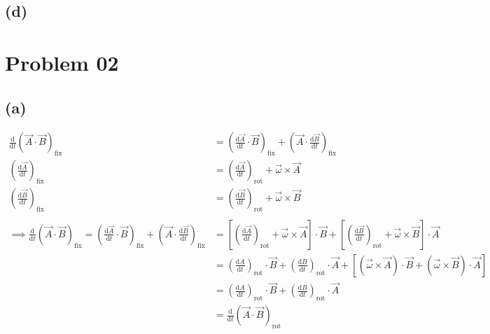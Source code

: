 \documentclass[letter, 10pts]{article}
\begin{document}
\subsection*{(d)} 


















\section*{Problem 02}
\subsection*{(a)}
\begin{align*}
\frac{\mathrm{d} }{\mathrm{d} t} \left(\vec{A} \cdot  \vec{B}\right)_\text{fix} &= 
\left(
\frac{\mathrm{d} \vec{A}}{\mathrm{d} t} \cdot \vec{B}
\right)_\text{fix} + 
\left(
\vec{A} \cdot  \frac{\mathrm{d} \vec{B}}{\mathrm{d} t}
\right)_\text{fix}
\\
\left(
\frac{\mathrm{d} \vec{A}}{\mathrm{d} t} \right)_\text{fix} 
&= 
\left(\frac{\mathrm{d} \vec{A}}{\mathrm{d} t}\right)_\text{rot}+ \vec{\omega} \times \vec{A} \\
\left(
\frac{\mathrm{d} \vec{B}}{\mathrm{d} t} \right)_\text{fix} 
&= 
\left(\frac{\mathrm{d} \vec{B}}{\mathrm{d} t}\right)_\text{rot}+ \vec{\omega} \times \vec{B} \\ 
\\\implies
\frac{\mathrm{d} }{\mathrm{d} t} \left(\vec{A} \cdot  \vec{B}\right)_\text{fix} = 
\left(
\frac{\mathrm{d} \vec{A}}{\mathrm{d} t} \cdot \vec{B}
\right)_\text{fix} + 
\left(
\vec{A} \cdot  \frac{\mathrm{d} \vec{B}}{\mathrm{d} t}
\right)_\text{fix} 
&= \left[
\left(\frac{\mathrm{d} \vec{A}}{\mathrm{d} t}\right)_\text{rot}+ \vec{\omega} \times \vec{A}
\right]\cdot \vec{B}
+\left[
\left(\frac{\mathrm{d} \vec{B}}{\mathrm{d} t}\right)_\text{rot}+ \vec{\omega} \times \vec{B}
\right]\cdot \vec{A}\\
&= 
\left(\frac{\mathrm{d} A}{\mathrm{d} t}\right)_\text{rot} \cdot \vec{B} + 
\left(\frac{\mathrm{d} B}{\mathrm{d} t}\right)_\text{rot} \cdot \vec{A} + 
\left[
	(\vec{\omega} \times \vec{A}) \cdot \vec{B} + (\vec{\omega} \times \vec{B}) \cdot \vec{A}
\right] \tag{check appendix for why third term is zero}
\\
&= 
\left(\frac{\mathrm{d} A}{\mathrm{d} t}\right)_\text{rot} \cdot \vec{B} + 
\left(\frac{\mathrm{d} B}{\mathrm{d} t}\right)_\text{rot} \cdot \vec{A} 
\\
&= 
\frac{\mathrm{d} }{\mathrm{d} t} 
\left(
\vec{A} \cdot \vec{B}\right)_\text{rot}\\
\end{align*}
\end{document}
